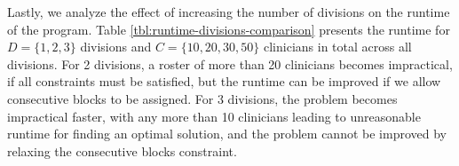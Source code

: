 Lastly, we analyze the effect of increasing the number of divisions on the runtime of the program. Table \ref{tbl:runtime-divisions-comparison} presents the runtime for $D = \{1, 2, 3\}$ divisions and $C = \{10, 20, 30, 50\}$ clinicians in total across all divisions. For 2 divisions, a roster of more than 20 clinicians becomes impractical, if all constraints must be satisfied, but the runtime can be improved if we allow consecutive blocks to be assigned. For 3 divisions, the problem becomes impractical faster, with any more than 10 clinicians leading to unreasonable runtime for finding an optimal solution, and the problem cannot be improved by relaxing the consecutive blocks constraint.




